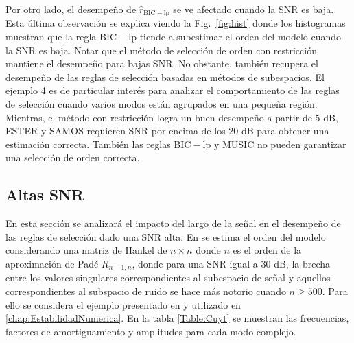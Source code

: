 Por otro lado, el desempeño de $\hat{r}_{\mathrm{BIC-lp}}$ se ve afectado cuando la SNR es baja. Esta última observación se explica viendo la Fig.~\ref{fig:hist} donde los histogramas muestran que la regla $\mathrm{BIC-lp}$ tiende a subestimar el orden del modelo cuando la SNR es baja. Notar que el método de selección de orden con restricción mantiene el desempeño para bajas SNR. No obstante, también recupera el desempeño de las reglas de selección basadas en métodos de subespacios. El ejemplo 4 es de particular interés para analizar el comportamiento de las reglas de selección cuando varios modos están agrupados en una pequeña región. Mientras, el método con restricción logra un buen desempeño a partir de 5 dB, ESTER y SAMOS requieren SNR por encima de los 20 dB para obtener una estimación correcta. También las reglas $\mathrm{BIC-lp}$ y MUSIC no pueden garantizar una selección de orden correcta.


\subsection{Altas SNR}\label{sec:HighSNR}

En esta sección se analizará el impacto del largo de la señal en el desempeño de las reglas de selección dado una SNR alta. En \cite{Cuyt2018} se estima el orden del modelo considerando una matriz de Hankel de $n\times n$ donde $n$ es el orden de la aproximación de Padé $R_{n-1,n}$, donde para una SNR igual a 30 dB, la brecha entre los valores singulares correspondientes al subespacio de señal y aquellos correspondientes  al subspacio de ruido se hace más notorio cuando $n\ge 500$. Para ello se considera el ejemplo presentado en \cite{Cuyt2018} y utilizado en \ref{chap:EstabilidadNumerica}. En la tabla \ref{Table:Cuyt} se muestran las frecuencias, factores de amortiguamiento y amplitudes para cada modo complejo.

